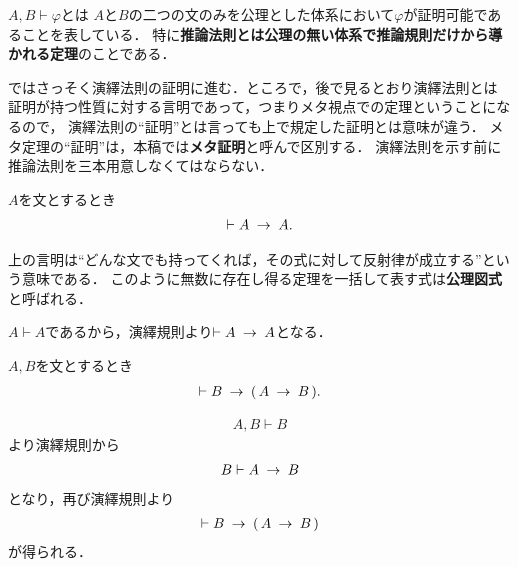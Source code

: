 	$A,B \vdash \varphi$とは
	$A$と$B$の二つの文のみを公理とした体系において$\varphi$が証明可能であることを表している．
	特に{\bf 推論法則とは公理の無い体系で推論規則だけから導かれる定理}のことである．
	
	ではさっそく演繹法則の証明に進む．ところで，後で見るとおり演繹法則とは
	証明が持つ性質に対する言明であって，つまりメタ視点での定理ということになるので，
	演繹法則の``証明''とは言っても上で規定した証明とは意味が違う．
	メタ定理の``証明''は，本稿では{\bf メタ証明}と呼んで区別する．
	演繹法則を示す前に推論法則を三本用意しなくてはならない．
	
	\begin{screen}
		\begin{logicalthm}[含意の反射律]\label{logicalthm:reflective_law_of_implication}
			$A$を文とするとき
			\begin{align}
				\vdash A \hspace{0.25em}\rightarrow\hspace{0.25em} A.
			\end{align}
		\end{logicalthm}
	\end{screen}
	
	上の言明は``どんな文でも持ってくれば，その式に対して反射律が成立する''という意味である．
	このように無数に存在し得る定理を一括して表す式は{\bf 公理図式}と呼ばれる．
	
	\begin{prf}
		$A \vdash A$であるから，演繹規則より$\vdash A \hspace{0.25em}\rightarrow\hspace{0.25em} A$となる．
		\QED
	\end{prf}
	
	\begin{screen}
		\begin{logicalthm}[含意の導入]
		\label{logicalthm:introduction_of_implication}
			$A,B$を文とするとき
			\begin{align}
				\vdash B \hspace{0.25em}\rightarrow\hspace{0.25em} (\, A \hspace{0.25em}\rightarrow\hspace{0.25em} B\, ).
			\end{align}
		\end{logicalthm}
	\end{screen}
	
	\begin{prf}
		\begin{align}
			A,B \vdash B
		\end{align}
		より演繹規則から
		\begin{align}
			B \vdash A \hspace{0.25em}\rightarrow\hspace{0.25em} B
		\end{align}
		となり，再び演繹規則より
		\begin{align}
			\vdash B \hspace{0.25em}\rightarrow\hspace{0.25em} (\, A \hspace{0.25em}\rightarrow\hspace{0.25em} B\, )
		\end{align}
		が得られる．
		\QED
	\end{prf}
	
